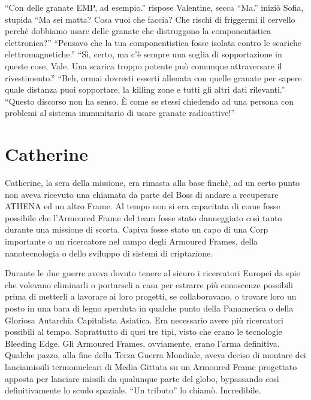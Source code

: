     ``Con delle granate EMP, ad esempio.'' rispose Valentine, secca ``Ma.'' iniziò Sofia, stupida ``Ma sei matta? Cosa
    vuoi che faccia? Che rischi di friggermi il cervello perchè dobbiamo usare delle granate che distruggono la
    componentistica elettronica?'' ``Pensavo che la tua componentistica fosse isolata contro le scariche
    elettromagnetiche.'' ``Sì, certo, ma c'è sempre una soglia di sopportazione in queste cose, Vale. Una scarica troppo
    potente può comunque attraversare il rivestimento.'' ``Beh, ormai dovresti esserti allenata con quelle granate per
    sapere quale distanza puoi sopportare, la killing zone e tutti gli altri dati rilevanti.'' ``Questo discorso non ha
    senso. È come se stessi chiedendo ad una persona con problemi al sistema immunitario di usare granate radioattive!''

  \section*{Catherine}

    Catherine, la sera della missione, era rimasta alla base finchè, ad un certo punto non aveva ricevuto una chiamata
    da parte del Boss di andare a recuperare ATHENA ed un altro Frame. Al tempo non si era capacitata di come fosse
    possibile che l'Armoured Frame del team fosse stato danneggiato così tanto durante una missione di scorta. Capiva
    fosse stato un capo di una Corp importante o un ricercatore nel campo degli Armoured Frames, della nanotecnologia o
    dello sviluppo di sistemi di criptazione.

    Durante le due guerre aveva dovuto tenere al sicuro i ricercatori Europei da spie che volevano eliminarli o
    portarseli a casa per estrarre più conoscenze possibili prima di metterli a lavorare ai loro progetti, se
    collaboravano, o trovare loro un posto in una bara di legno sperduta in qualche punto della Panamerica o della
    Gloriosa Autarchia Capitalista Asiatica. Era necessario avere più ricercatori possibili al tempo. Soprattutto di
    quei tre tipi, visto che erano le tecnologie Bleeding Edge. Gli Armoured Frames, ovviamente, erano l'arma
    definitiva. Qualche pazzo, alla fine della Terza Guerra Mondiale, aveva deciso di montare dei lanciamissili
    termonucleari di Media Gittata su un Armoured Frame progettato apposta per lanciare missili da qualunque parte del
    globo, bypassando così definitivamente lo scudo spaziale. ``Un tributo'' lo chiamò. Incredibile.

